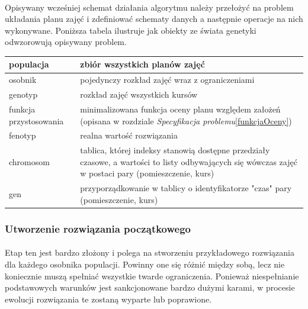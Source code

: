 \paragraph{}Opisywany wcześniej schemat działania algorytmu należy przełożyć na problem układania planu zajęć i zdefiniować schematy danych a następnie operacje na nich wykonywane. Poniższa tabela ilustruje jak obiekty ze świata genetyki odwzorowują opisywany problem.
\begin{center}
\begin{tabular}{| l | p{10cm} |}
\hline
populacja & zbiór wszystkich planów zajęć \\ \hline
osobnik & pojedynczy rozkład zajęć wraz z ograniczeniami \\ \hline
genotyp & rozkład zajęć wszystkich kursów \\ \hline
funkcja przystosowania & minimalizowana funkcja oceny planu względem założeń (opisana w rozdziale \emph{Specyfikacja problemu}\ref{funkcjaOceny}) \\ \hline
fenotyp & realna wartość rozwiązania \\ \hline
chromosom & tablica, której indeksy stanowią dostępne przedziały czasowe, a wartości to listy odbywających się wówczas zajęć w postaci pary (pomieszczenie, kurs) \\ \hline
gen & przyporządkowanie w tablicy o identyfikatorze "czas" pary  (pomieszczenie, kurs) \\ \hline
\end{tabular}
\end{center}
\subsubsection{Utworzenie rozwiązania początkowego}
\paragraph{}Etap ten jest bardzo złożony i polega na stworzeniu przykładowego rozwiązania dla każdego osobnika populacji. Powinny one się różnić między sobą, lecz nie koniecznie muszą spełniać wszystkie twarde ograniczenia. Ponieważ niespełnianie podstawowych warunków jest sankcjonowane bardzo dużymi karami, w procesie ewolucji rozwiązania te zostaną wyparte lub poprawione.
